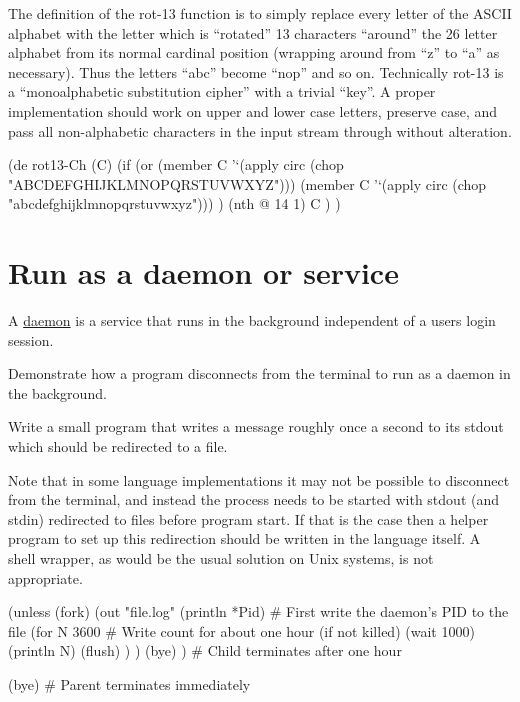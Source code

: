 The definition of the rot-13 function is to simply replace every letter
of the ASCII alphabet with the letter which is ``rotated'' 13 characters
``around'' the 26 letter alphabet from its normal cardinal position
(wrapping around from ``z'' to ``a'' as necessary). Thus the letters
``abc'' become ``nop'' and so on. Technically rot-13 is a
``monoalphabetic substitution cipher'' with a trivial ``key''. A proper
implementation should work on upper and lower case letters, preserve
case, and pass all non-alphabetic characters in the input stream through
without alteration.


\begin{wideverbatim}

(de rot13-Ch (C)
   (if
      (or
         (member C '`(apply circ (chop "ABCDEFGHIJKLMNOPQRSTUVWXYZ")))
         (member C '`(apply circ (chop "abcdefghijklmnopqrstuvwxyz"))) )
      (nth @ 14 1)
      C ) )

\end{wideverbatim}

\pagebreak{}
\section*{Run as a daemon or service}

A \href{http://en.wikipedia.org/wiki/Daemon\_(computing)}{daemon} is a
service that runs in the background independent of a users login
session.

Demonstrate how a program disconnects from the terminal to run as a
daemon in the background.

Write a small program that writes a message roughly once a second to its
stdout which should be redirected to a file.

Note that in some language implementations it may not be possible to
disconnect from the terminal, and instead the process needs to be
started with stdout (and stdin) redirected to files before program
start. If that is the case then a helper program to set up this
redirection should be written in the language itself. A shell wrapper,
as would be the usual solution on Unix systems, is not appropriate.


\begin{wideverbatim}

(unless (fork)
   (out "file.log"
      (println *Pid)    # First write the daemon's PID to the file
      (for N 3600       # Write count for about one hour (if not killed)
         (wait 1000)
         (println N)
         (flush) ) )
   (bye) )              # Child terminates after one hour

(bye)                   # Parent terminates immediately

\end{wideverbatim}

